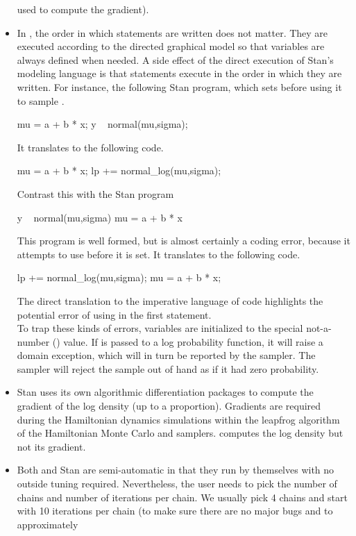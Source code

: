\begin{itemize}
  used to compute the gradient).
\item In \BUGS, the order in which statements are written does not
  matter.  They are executed according to the directed graphical model
  so that variables are always defined when needed.  A side effect of
  the direct execution of Stan's modeling language is that statements
  execute in the order in which they are written.  For instance, the
  following Stan program, which sets  before using it to
  sample .
%
\begin{stancode}
mu = a + b * x;
y ~ normal(mu,sigma);
\end{stancode}
%
It translates to the following \Cpp code.
%
\begin{stancode}
mu = a + b * x;
lp += normal_log(mu,sigma);
\end{stancode}
%
Contrast this with the Stan program
%
\begin{stancode}
y ~ normal(mu,sigma)
mu = a + b * x
\end{stancode}
%
This program is well formed, but is almost certainly
a coding error, because it attempts to use  before
it is set. It translates to the following \Cpp code.
%
\begin{stancode}
lp += normal_log(mu,sigma);
mu = a + b * x;
\end{stancode}
%
The direct translation to the imperative language of \Cpp code
highlights the potential error of using  in the first
statement.
\\[8pt]
To trap these kinds of errors, variables are initialized to the
special not-a-number () value.  If  is passed to a
log probability function, it will raise a domain exception, which will
in turn be reported by the sampler.  The sampler will reject the
sample out of hand as if it had zero probability.
%
\item Stan uses its own \Cpp algorithmic differentiation packages to
  compute the gradient of the log density (up to a proportion).
  Gradients are required during the Hamiltonian dynamics simulations
  within the leapfrog algorithm of the Hamiltonian Monte Carlo and
  \NUTS samplers.  \BUGS computes the log density but not its
  gradient.
\item Both \BUGS and Stan are semi-automatic in that they run by
  themselves with no outside tuning required. Nevertheless, the user
  needs to pick the number of chains and number of iterations per
  chain.  We usually pick 4 chains and start with 10 iterations per
  chain (to make sure there are no major bugs and to approximately

\end{itemize}
